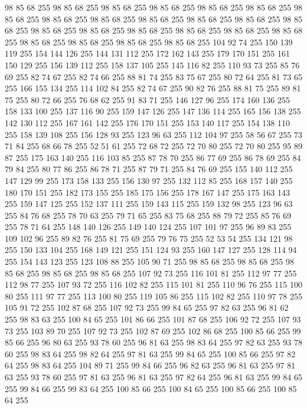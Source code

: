 98 85 68 255 98 85 68 255 98 85 68 255 98 85 68 255 98 85 68 255 98 85 68 255 98 85 68 255 98 85 68 255 98 85 68 255 98 85 68 255 98 85 68 255 98 85 68 255 98 85 68 255 98 85 68 255 98 85 68 255 98 85 68 255 98 85 68 255 98 85 68 255 98 85 68 255 98 85 68 255 98 85 68 255 98 85 68 255 98 85 68 255 104 92 74 255 150 139 119 255 154 144 126 255 144 131 112 255 172 162 143 255 179 170 151 255 161 150 129 255 156 139 112 255 158 137 105 255 145 116 82 255 110 93 73 255 85 76 69 255 82 74 67 255 82 74 66 255 88 81 74 255 83 75 67 255 80 72 64 255 81 73 65 255 166 155 134 255 114 102 84 255 82 74 67 255 90 82 76 255 88 81 75 255 89 81 75 255 80 72 66 255 76 68 62 255 91 83 71 255 146 127 96 255 174 160 136 255 158 133 100 255 137 116 90 255 159 147 126 255 147 136 114 255 165 156 138 255 142 130 112 255 167 161 142 255 176 170 151 255 153 140 117 255 154 138 110 255 158 139 108 255 156 128 93 255
123 96 63 255 112 104 97 255 58 56 67 255 73 71 84 255 68 66 78 255 52 51 61 255 72 68 72 255 72 70 80 255 72 70 80 255 95 89 87 255 175 163 140 255 116 103 85 255 87 78 70 255 86 77 69 255 86 78 69 255 84 79 84 255 80 77 86 255 86 78 71 255 87 79 71 255 84 76 69 255 155 140 112 255 147 129 99 255 173 158 133 255 156 130 97 255 132 112 85 255 168 157 140 255 180 170 151 255 182 173 155 255 185 175 156 255 178 167 147 255 175 163 143 255 159 147 125 255 152 137 111 255 159 143 115 255 159 132 98 255 123 96 63 255 84 76 68 255 78 70 63 255 79 71 65 255 83 75 68 255 88 79 72 255 85 76 69 255 78 71 64 255 148 140 126 255 149 140 124 255 107 101 97 255 96 89 83 255 109 102 96 255 89 82 76 255 81 75 69 255 79 76 75 255 52 53 54 255 134 121 98 255 150 133 104 255 168 149 121 255 151 124 93 255 160 147 127 255 128 114 94 255 154 143 123 255 123 108 88 255 105 90 71 255 98 85 68 255 98 85 68 255 98 85 68 255
98 85 68 255 98 85 68 255 107 92 73 255 116 101 81 255 112 97 77 255 112 98 77 255 107 93 72 255 116 102 82 255 115 101 81 255 110 96 76 255 115 100 80 255 111 97 77 255 113 100 80 255 119 105 86 255 115 102 82 255 110 97 78 255 105 91 72 255 102 87 68 255 107 92 73 255 99 84 65 255 97 82 63 255 96 81 62 255 98 83 63 255 100 84 65 255 101 86 66 255 101 87 68 255 106 92 72 255 107 93 73 255 103 89 70 255 107 92 73 255 102 87 69 255 102 86 68 255 100 85 66 255 99 85 66 255 96 80 63 255 93 78 60 255 96 81 63 255 98 83 64 255 97 82 63 255 93 78 60 255 98 83 64 255 98 82 64 255 97 81 63 255 99 84 65 255 100 85 66 255 97 82 64 255 98 83 64 255 104 89 71 255 99 84 66 255 96 82 63 255 96 81 63 255 97 81 63 255 93 78 60 255 97 81 63 255 96 81 63 255 97 82 64 255 96 81 63 255 99 84 65 255 99 84 66 255 99 83 64 255 100 85 66 255 100 84 65 255 100 85 66 255 100 85 64 255
